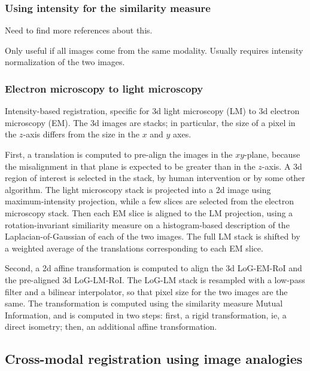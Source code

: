 \documentclass[11pt]{article} %
\begin{document}
    \subsubsection{Using intensity for the similarity measure}
Need to find more references about this.

Only useful if all images come from the same modality. Usually requires intensity normalization of the two images.
    \subsubsection{Electron microscopy to light microscopy \cite{acosta:intensity}}
Intensity-based registration, specific for 3d light microscopy (LM) to 3d electron microscopy (EM). The 3d images are stacks; in particular, the size of a pixel in the $z$-axis differs from the size in the $x$ and $y$ axes.

First, a translation is computed to pre-align the images in the $xy$-plane, because the misalignment in that plane is expected to be greater than in the $z$-axis. A 3d region of interest is selected in the stack, by human intervention or by some other algorithm. The light microscopy stack is projected into a 2d image using maximum-intensity projection, while a few slices are selected from the electron microscopy stack. Then each EM slice is aligned to the LM projection, using a rotation-invariant similiarity measure on a histogram-based description of the Laplacian-of-Gaussian of each of the two images. The full LM stack is shifted by a weighted average of the translations corresponding to each EM slice.

Second, a 2d affine transformation is computed to align the 3d LoG-EM-RoI and the pre-aligned 3d LoG-LM-RoI. The LoG-LM stack is resampled with a low-pass filter and a bilinear interpolator, so that pixel size for the two images are the same. The transformation is computed using the similarity measure Mutual Information, and is computed in two steps: first, a rigid transformation, ie, a direct isometry; then, an additional affine transformation.

  \subsection{Cross-modal registration using image analogies}
\end{document}
